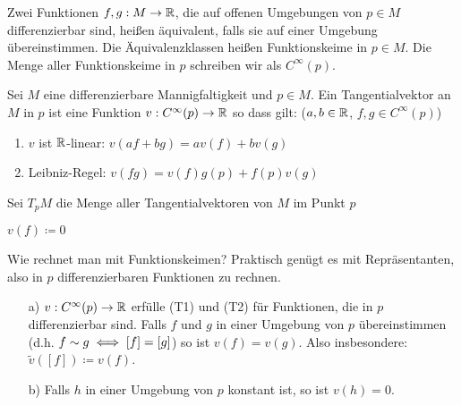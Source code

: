\documentclass[a4paper,twoside,DIV15,BCOR12mm]{scrbook}
\renewcommand{\da}{\coloneqq}
\begin{document}
\begin{definition}[Funktionskeim]
Zwei Funktionen $f,g:M \to \mathbb{R}$, die auf offenen Umgebungen von $p\in M$ differenzierbar sind, heißen äquivalent, falls sie auf einer Umgebung übereinstimmen. Die Äquivalenzklassen heißen Funktionskeime in $p\in M$. Die Menge aller Funktionskeime in $p$ schreiben wir als $C^\infty(p)$.
\end{definition}

\begin{definition}[Tangentialvektor]
Sei $M$ eine differenzierbare Mannigfaltigkeit und $p\in M$. Ein Tangentialvektor an $M$ in $p$ ist eine Funktion $v:C^\infty(p) \to \mathbb{R}$ so dass gilt: ($a,b\in\mathbb{R}$, $f,g\in C^\infty(p)$)
\begin{enumerate}[(T1)]
\item $v$ ist $\mathbb{R}$-linear: $v(af + bg) = a v(f) + b v(g)$
\item Leibniz-Regel: $v(fg) = v(f)g(p) + f(p)v(g)$ 
\end{enumerate}
Sei $T_pM$ die Menge aller Tangentialvektoren von $M$ im Punkt $p$
\end{definition}

\begin{beispiel}
$v(f) \da 0$
\end{beispiel}

Wie rechnet man mit Funktionskeimen? Praktisch genügt es mit Repräsentanten, also in $p$ differenzierbaren Funktionen zu rechnen.

\begin{lemma}
\begin{itemize}
\item[a)]
$v:C^\infty(p) \to \mathbb{R}$ erfülle (T1) und (T2) für Funktionen, die in $p$ differenzierbar sind. Falls $f$ und $g$ in einer Umgebung von $p$ übereinstimmen (d.h. $f\sim g \iff [f] = [g]$) so ist $v(f) = v(g)$. Also insbesondere: $\tilde v([f]) \da v(f)$.
\item[b)]
Falls $h$ in einer Umgebung von $p$ konstant ist, so ist $v(h)=0$.
\end{itemize}
\end{lemma}
\end{document}
